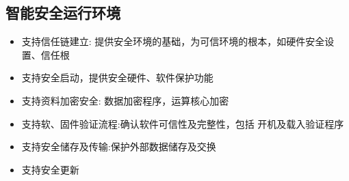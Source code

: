 \documentclass[letterpaper,10pt,english]{sphinxmanual}
\begin{document}
\subsection{智能安全运行环境}
\label{\detokenize{contents/system-overview/features:id9}}\begin{itemize}
\item {} 
\sphinxAtStartPar
支持信任链建立:
提供安全环境的基础，为可信环境的根本，如硬件安全设置、信任根

\item {} 
\sphinxAtStartPar
支持安全启动，提供安全硬件、软件保护功能

\item {} 
\sphinxAtStartPar
支持资料加密安全: 数据加密程序，运算核心加密

\item {} 
\sphinxAtStartPar
支持软、固件验证流程:确认软件可信性及完整性，包括 开机及载入验证程序

\item {} 
\sphinxAtStartPar
支持安全储存及传输:保护外部数据储存及交换

\item {} 
\sphinxAtStartPar
支持安全更新

\end{itemize}
\end{document}
